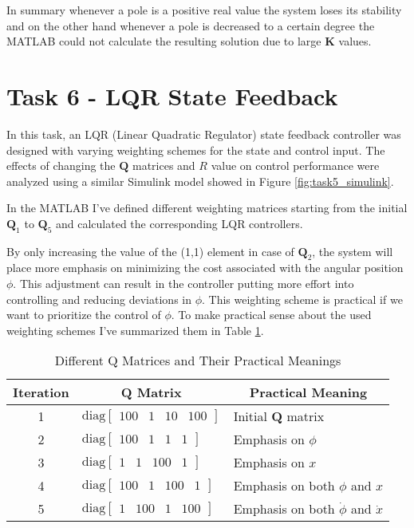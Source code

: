\documentclass[12pt]{article}
\begin{document}
\noindent In summary whenever a pole is a positive real value the system loses its stability and on the other hand whenever a pole is decreased to a certain degree the MATLAB could not calculate the resulting solution due to large $\mathbf{K}$ values.

\section*{Task 6 - LQR State Feedback}
In this task, an LQR (Linear Quadratic Regulator) state feedback controller was designed with varying weighting schemes for the state and control input. The effects of changing the $\mathbf{Q}$ matrices and \(R\) value on control performance were analyzed using a similar Simulink model showed in Figure \ref{fig:task5_simulink}.
\medskip

\noindent In the MATLAB I've defined different weighting matrices starting from the initial $\mathbf{Q}_1$ to $\mathbf{Q}_5$ and calculated the corresponding LQR controllers.
\medskip

\noindent By only increasing the value of the (1,1) element in case of $\mathbf{Q}_2$, the system will place more emphasis on minimizing the cost associated with the angular position $\phi$. This adjustment can result in the controller putting more effort into controlling and reducing deviations in $\phi$. This weighting scheme is practical if we want to prioritize the control of $\phi$. To make practical sense about the used weighting schemes I've summarized them in Table \ref{tab:LQR_Q}.

\begin{table}[htbp]
  \centering
  \caption{Different Q Matrices and Their Practical Meanings}
  \label{tab:LQR_Q}
  \begin{tabular}{@{}cll@{}}
    \hline
    \textbf{Iteration} & \multicolumn{1}{c}{\textbf{Q Matrix}} & \multicolumn{1}{c}{\textbf{Practical Meaning}} \\
    \hline
    1 & $\text{diag}\begin{bmatrix} 100 & 1 & 10 & 100 \end{bmatrix}$ & Initial \textbf{Q} matrix \\[0.2cm]
    2 & $\text{diag}\begin{bmatrix} 100 & 1 & 1 & 1 \end{bmatrix}$ & Emphasis on $\phi$ \\[0.2cm]
    3 & $\text{diag}\begin{bmatrix} 1 & 1 & 100 & 1 \end{bmatrix}$ & Emphasis on $x$ \\[0.2cm]
    4 & $\text{diag}\begin{bmatrix} 100 & 1 & 100 & 1 \end{bmatrix}$ & Emphasis on both $\phi$ and $x$ \\[0.2cm]
    5 & $\text{diag}\begin{bmatrix} 1 & 100 & 1 & 100 \end{bmatrix}$ & Emphasis on both $\dot{\phi}$ and $\dot{x}$ \\
  \end{tabular}
\end{table}
\end{document}

